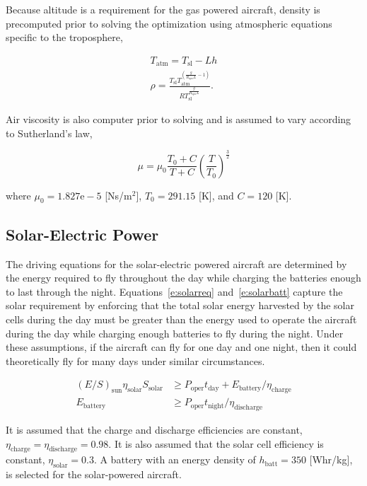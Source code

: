 \documentclass[]{aiaa-tc}%
\begin{document}
Because altitude is a requirement for the gas powered aircraft, density is precomputed prior to solving the optimization using atmospheric equations specific to the troposphere,\cite{isaatm} 

\begin{align}
    \label{e:Talt}
    T_{\text{atm}} = T_{\text{sl}} - Lh \\
    \label{e:rhot}
    \rho = \frac{T_{\text{sl}}T_{\text{atm}}^{\left( \frac{g}{R_{\text{spec}}L} -1 \right)}}{R T_{\text{sl}}^{\frac{g}{R_{\text{spec}}L}}}.
\end{align}

Air viscosity is also computer prior to solving and is assumed to vary according to Sutherland's law, 

\begin{equation}
    \label{e:sutherland}
    \mu = \mu_0 \frac{T_0 + C}{T+C} \left( \frac{T}{T_0} \right)^{\frac{3}{2}}
\end{equation}

where $\mu_0 = 1.827\text{e}-5$ [Ns/m$^2$], $T_0 = 291.15$ [K], and $C = 120$ [K].

\subsection{Solar-Electric Power}

The driving equations for the solar-electric powered aircraft are determined by the energy required to fly throughout the day while charging the batteries enough to last through the night.  
Equations~\ref{e:solarreq} and~\ref{e:solarbatt} capture the solar requirement by enforcing that the total solar energy harvested by the solar cells during the day must be greater than the energy used to operate the aircraft during the day while charging enough batteries to fly during the night. 
Under these assumptions, if the aircraft can fly for one day and one night, then it could theoretically fly for many days under similar circumstances. 

    \begin{align}
        \label{e:solarreq}
        (E/S)_{\text{sun}} \eta_{\text{solar}} S_{\text{solar}} &\geq P_{\text{oper}}t_{\text{day}} + E_{\text{battery}}/\eta_{\text{charge}} \\
        \label{e:solarbatt}
        E_{\text{battery}} &\geq P_{\text{oper}}t_{\text{night}}/\eta_{\text{discharge}}
    \end{align}
    
    It is assumed that the charge and discharge efficiencies are constant, $\eta_{\text{charge}} = \eta_{\text{discharge}} = 0.98$. 
    It is also assumed that the solar cell efficiency is constant, $\eta_{\text{solar}} = 0.3$. 
    A battery with an energy density of $h_{\text{batt}} = 350$ [Whr/kg], is selected for the solar-powered aircraft. 
\end{document}
